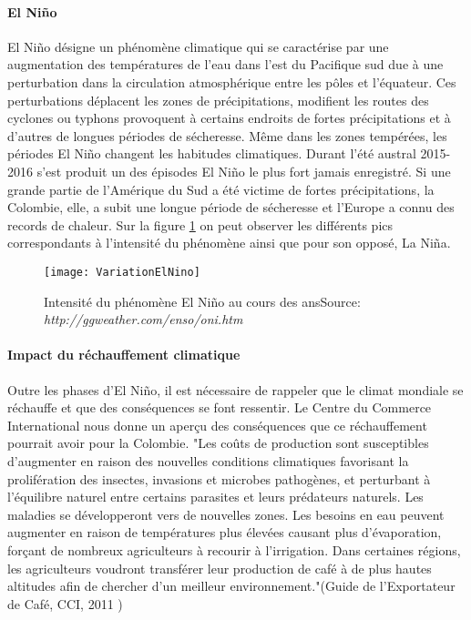 


\paragraph{El Niño}El Niño désigne un phénomène climatique qui se caractérise par une augmentation des températures de l'eau dans l'est du Pacifique sud due à une perturbation dans la circulation atmosphérique entre les pôles et l'équateur. Ces perturbations déplacent les zones de précipitations, modifient les routes des cyclones ou typhons provoquent à certains endroits de fortes précipitations et à d'autres de longues périodes de sécheresse. Même dans les zones tempérées, les périodes El Niño changent les habitudes climatiques. Durant l'été austral 2015-2016 s'est produit un des épisodes El Niño le plus fort jamais enregistré\cite{OMM}. Si une grande partie de l'Amérique du Sud a été victime de fortes précipitations, la Colombie, elle, a subit une longue période de sécheresse et l'Europe a connu des records de chaleur. Sur la figure \ref{Nino} on peut observer les différents pics correspondants à l'intensité du phénomène ainsi que pour son opposé, La Niña. 

\begin{figure}[H]
	\texttt{[image: VariationElNino]}
	\caption{\label{Nino} Intensité du phénomène El Niño au cours des ans\newline Source: \textit{http://ggweather.com/enso/oni.htm}}
\end{figure}

\paragraph{Impact du réchauffement climatique} Outre les phases d'El Niño, il est nécessaire de rappeler que le climat mondiale se réchauffe et que des conséquences se font ressentir. Le Centre du Commerce International \cite{CCI} nous donne un aperçu des conséquences que ce réchauffement pourrait avoir pour la Colombie. "Les coûts de production sont susceptibles d'augmenter en raison des nouvelles conditions climatiques favorisant la prolifération des insectes, invasions et microbes pathogènes, et perturbant à l'équilibre naturel entre certains parasites et leurs prédateurs naturels. Les maladies se développeront vers de nouvelles zones. Les besoins en eau peuvent augmenter en raison de températures plus élevées causant plus d'évaporation, forçant de nombreux agriculteurs à recourir à l'irrigation. Dans certaines régions, les agriculteurs voudront transférer leur production de café à de plus hautes altitudes afin de chercher d'un meilleur environnement."(Guide de l'Exportateur de Café, CCI, 2011 \cite{GuideCafe})


